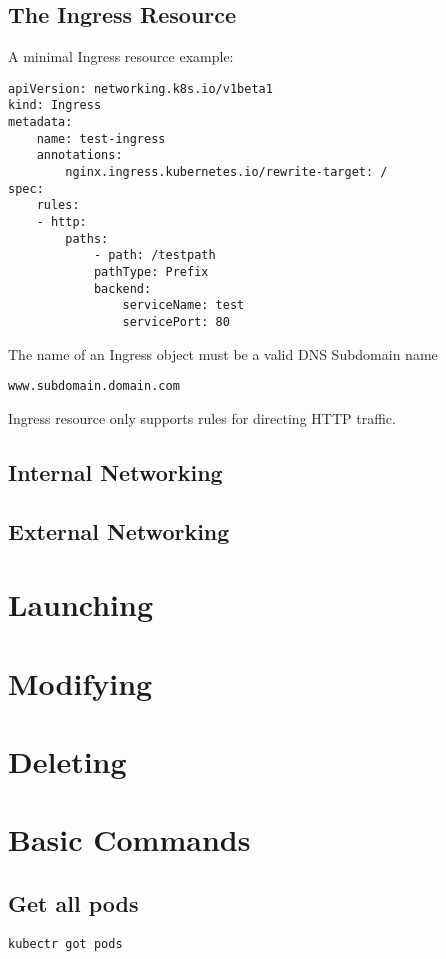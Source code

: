 \documentclass[]{article}
\newcommand{\<}{\guilsinglleft}
\renewcommand{\>}{\guilsinglright}
\begin{document}
\subsection{The Ingress Resource}
A minimal Ingress resource example:
\begin{lstlisting}
apiVersion: networking.k8s.io/v1beta1
kind: Ingress
metadata:
	name: test-ingress
	annotations:
		nginx.ingress.kubernetes.io/rewrite-target: /
spec:
	rules:
	- http:
		paths:
			- path: /testpath
			pathType: Prefix
			backend:
				serviceName: test
				servicePort: 80
\end{lstlisting}
The name of an Ingress object must be a valid DNS Subdomain name
\begin{lstlisting}
www.subdomain.domain.com
\end{lstlisting}
Ingress resource only supports rules for directing HTTP traffic.

\subsection{Internal Networking}

\subsection{External Networking}

\section{Launching}

\section{Modifying}

\section{Deleting}


\section{Basic Commands}
\subsection{Get all pods}
\begin{lstlisting}
kubectr got pods
\end{lstlisting}
\end{document}
